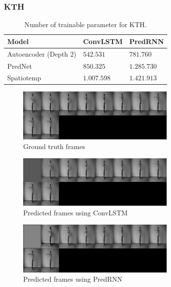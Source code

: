   \subsubsection{KTH}
   \begin{table}[H]
    \begin{center}
     \begin{tabular}{| l | l | l |}\hline
      \textbf{Model} & \textbf{ConvLSTM} & \textbf{PredRNN} \\\hline
      Autoencoder (Depth $2$) & $542.531$ & $781.760$ \\\hline
      PredNet & $850.325$ & $1.285.730$ \\\hline
      Spatiotemp & $1.007.598$ & $1.421.913$ \\\hline
     \end{tabular}
    \end{center}
    \caption{Number of trainable parameter for KTH.}
   \end{table}\noindent
   \begin{figure}[H]
    \includegraphics[width=0.7\textwidth]{../Images/prednet_kth_groundtruth.png}
    \centering
    \caption{Ground truth frames}
    \label{fig:prednet_kth_groundtruth}
   \end{figure}\noindent
   \begin{figure}[H]
    \includegraphics[width=0.7\textwidth]{../Images/prednet_kth_convlstm.png}
    \centering
    \caption{Predicted frames using ConvLSTM}
    \label{fig:prednet_kth_convlstm}
   \end{figure}\noindent
   \begin{figure}[H]
    \includegraphics[width=0.7\textwidth]{../Images/prednet_kth_predrnn.png}
    \centering
    \caption{Predicted frames using PredRNN}
    \label{fig:prednet_kth_predrnn}
   \end{figure}\noindent
